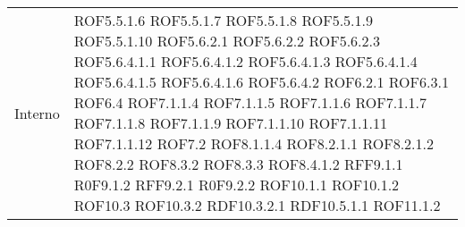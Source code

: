 \begin{center}
\begin{longtable}{| p{4cm} | p{4cm} |}
\hline
Interno & ROF5.5.1.6 \newline ROF5.5.1.7 \newline ROF5.5.1.8 \newline ROF5.5.1.9 \newline ROF5.5.1.10 \newline ROF5.6.2.1 \newline ROF5.6.2.2 \newline ROF5.6.2.3 \newline ROF5.6.4.1.1 \newline ROF5.6.4.1.2 \newline ROF5.6.4.1.3 \newline ROF5.6.4.1.4 \newline ROF5.6.4.1.5 \newline ROF5.6.4.1.6 \newline ROF5.6.4.2 \newline ROF6.2.1 \newline ROF6.3.1 \newline ROF6.4 \newline ROF7.1.1.4 \newline ROF7.1.1.5 \newline ROF7.1.1.6 \newline ROF7.1.1.7 \newline ROF7.1.1.8 \newline ROF7.1.1.9 \newline ROF7.1.1.10 \newline ROF7.1.1.11 \newline ROF7.1.1.12 \newline ROF7.2 \newline ROF8.1.1.4 \newline ROF8.2.1.1 \newline ROF8.2.1.2 \newline ROF8.2.2 \newline ROF8.3.2 \newline ROF8.3.3 \newline ROF8.4.1.2 \newline RFF9.1.1 \newline R0F9.1.2 \newline RFF9.2.1 \newline R0F9.2.2 \newline ROF10.1.1 \newline ROF10.1.2 \newline ROF10.3 \newline ROF10.3.2 \newline RDF10.3.2.1 \newline RDF10.5.1.1 \newline ROF11.1.2 \\

\end{longtable}
\end{center}
